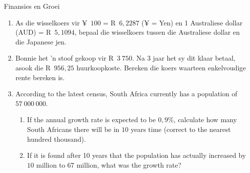 \begin{eocexercises}{Finansies en Groei}
\begin{enumerate}[label=\textbf{\arabic*}.]
	\item As die wisselkoers vir ¥~$100$ = R~$6,2287$ (¥ = Yen) en 1 Australiese dollar (AUD) = R~$5,1094$, bepaal die wisselkoers
tussen die Australiese dollar en die Japanese jen.
	\item Bonnie het ’n stoof gekoop vir R~$3~750$. Na 3 jaar het sy dit klaar betaal, asook die R~$956,25$ huurkoopkoste.
Bereken die koers waarteen enkelvoudige rente bereken is.
	\item According to the latest census, South Africa currently has a population of $57~000~000$.
	\begin{enumerate}[noitemsep, label=\textbf{(\alph*)} ]
	    \item If the annual growth rate is expected to be $0,9\%$, calculate how many South Africans there will be in $10$ years time (correct to the nearest hundred thousand).

	    \item If it is found after 10 years that the population has actually increased by $10$ million to $67$ million, what was the growth rate?
	\end{enumerate}

    \end{enumerate}

\end{eocexercises}
